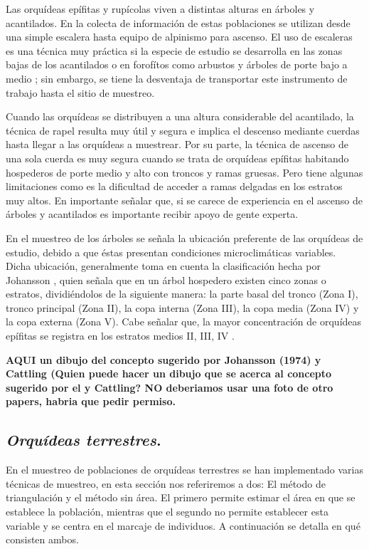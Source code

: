 \documentclass[
]{book}
\theoremstyle{definition}
\theoremstyle{definition}
\theoremstyle{definition}
\theoremstyle{definition}
\theoremstyle{remark}
\begin{document}
Las orquídeas epífitas y rupícolas viven a distintas alturas en árboles y acantilados.
En la colecta de información de estas poblaciones se utilizan desde una simple escalera hasta equipo de alpinismo para ascenso.
El uso de escaleras es una técnica muy práctica si la especie de estudio se desarrolla en las zonas bajas de los acantilados o en forofítos como arbustos y árboles de porte bajo a medio \citep{hernandez1992dinamica} ; sin embargo, se tiene la desventaja de transportar este instrumento de trabajo hasta el sitio de muestreo.

Cuando las orquídeas se distribuyen a una altura considerable del acantilado, la técnica de rapel resulta muy útil y segura e implica el descenso mediante cuerdas hasta llegar a las orquídeas a muestrear.
Por su parte, la técnica de ascenso de una sola cuerda es muy segura \citep{jepson2000tree} cuando se trata de orquídeas epífitas habitando hospederos de porte medio y alto con troncos y ramas gruesas.
Pero tiene algunas limitaciones como es la dificultad de acceder a ramas delgadas en los estratos muy altos.
En importante señalar que, si se carece de experiencia en el ascenso de árboles y acantilados es importante recibir apoyo de gente experta.

En el muestreo de los árboles se señala la ubicación preferente de las orquídeas de estudio, debido a que éstas presentan condiciones microclimáticas variables.
Dicha ubicación, generalmente toma en cuenta la clasificación hecha por Johansson \citep{johansson1974ecology, catling1986epiphytic}, quien señala que en un árbol hospedero existen cinco zonas o estratos, dividiéndolos de la siguiente manera: la parte basal del tronco (Zona I), tronco principal (Zona II), la copa interna (Zona III), la copa media (Zona IV) y la copa externa (Zona V).
Cabe señalar que, la mayor concentración de orquídeas epífitas se registra en los estratos medios II, III, IV \citep{mondragon2007life}.

\textbf{AQUI un dibujo del concepto sugerido por Johansson (1974) y Cattling (Quien puede hacer un dibujo que se acerca al concepto sugerido por el y Cattling? NO deberiamos usar una foto de otro papers, habria que pedir permiso.}

\subsection{\texorpdfstring{\emph{Orquídeas terrestres}.}{Orquídeas terrestres.}}\label{orquuxeddeas-terrestres.}

En el muestreo de poblaciones de orquídeas terrestres se han implementado varias técnicas de muestreo, en esta sección nos referiremos a dos: El método de triangulación y el método sin área.
El primero permite estimar el área en que se establece la población, mientras que el segundo no permite establecer esta variable y se centra en el marcaje de individuos.
A continuación se detalla en qué consisten ambos.
\end{document}
